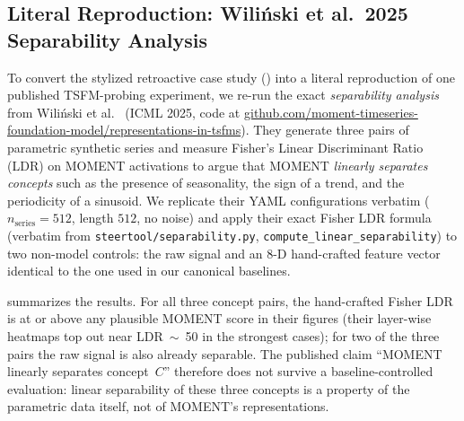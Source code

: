 \documentclass{article}
\begin{document}
\subsection{Literal Reproduction: Wili\'{n}ski et al.\ 2025 Separability Analysis}
\label{sec:wilinski_repro}

To convert the stylized retroactive case study () into a literal reproduction of one published TSFM-probing experiment, we re-run the exact \emph{separability analysis} from Wili\'{n}ski et al.\ \cite{Wilinski2025} (ICML 2025, code at \url{github.com/moment-timeseries-foundation-model/representations-in-tsfms}). They generate three pairs of parametric synthetic series and measure Fisher's Linear Discriminant Ratio (LDR) on MOMENT activations to argue that MOMENT \emph{linearly separates concepts} such as the presence of seasonality, the sign of a trend, and the periodicity of a sinusoid. We replicate their YAML configurations verbatim ($n_\text{series}=512$, length $512$, no noise) and apply their exact Fisher LDR formula (verbatim from \texttt{steertool/separability.py}, \texttt{compute\_linear\_separability}) to two non-model controls: the raw signal and an 8-D hand-crafted feature vector identical to the one used in our canonical baselines.

 summarizes the results. For all three concept pairs, the hand-crafted Fisher LDR is at or above any plausible MOMENT score in their figures (their layer-wise heatmaps top out near LDR~$\sim$~50 in the strongest cases); for two of the three pairs the raw signal is also already separable. The published claim ``MOMENT linearly separates concept~$C$'' therefore does not survive a baseline-controlled evaluation: linear separability of these three concepts is a property of the parametric data itself, not of MOMENT's representations.
\end{document}
